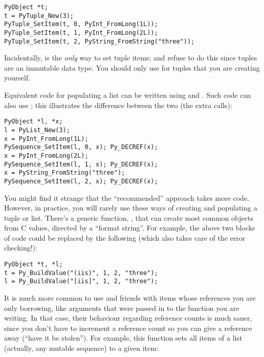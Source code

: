 \documentclass[twoside]{report}
\begin{document}
\begin{verbatim}
PyObject *t;
t = PyTuple_New(3);
PyTuple_SetItem(t, 0, PyInt_FromLong(1L));
PyTuple_SetItem(t, 1, PyInt_FromLong(2L));
PyTuple_SetItem(t, 2, PyString_FromString("three"));
\end{verbatim}

Incidentally,  is the \emph{only} way to set
tuple items;  and 
refuse to do this since tuples are an immutable data type.  You should
only use  for tuples that you are creating
yourself.

Equivalent code for populating a list can be written using 
 and .  Such code can also 
use ; this illustrates the difference 
between the two (the extra  calls):

\begin{verbatim}
PyObject *l, *x;
l = PyList_New(3);
x = PyInt_FromLong(1L);
PySequence_SetItem(l, 0, x); Py_DECREF(x);
x = PyInt_FromLong(2L);
PySequence_SetItem(l, 1, x); Py_DECREF(x);
x = PyString_FromString("three");
PySequence_SetItem(l, 2, x); Py_DECREF(x);
\end{verbatim}

You might find it strange that the ``recommended'' approach takes more
code.  However, in practice, you will rarely use these ways of
creating and populating a tuple or list.  There's a generic function,
, that can create most common objects from C 
values, directed by a ``format string''.  For example, the above two 
blocks of code could be replaced by the following (which also takes 
care of the error checking!):

\begin{verbatim}
PyObject *t, *l;
t = Py_BuildValue("(iis)", 1, 2, "three");
l = Py_BuildValue("[iis]", 1, 2, "three");
\end{verbatim}

It is much more common to use  and friends 
with items whose references you are only borrowing, like arguments 
that were passed in to the function you are writing.  In that case, 
their behaviour regarding reference counts is much saner, since you 
don't have to increment a reference count so you can give a reference 
away (``have it be stolen'').  For example, this function sets all 
items of a list (actually, any mutable sequence) to a given item:
\end{document}
